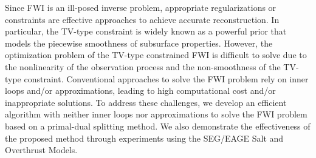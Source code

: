 Since FWI is an ill-posed inverse problem, appropriate regularizations or constraints are effective approaches to achieve accurate reconstruction.
In particular, the TV-type constraint is widely known as a powerful prior that models the piecewise smoothness of subsurface properties.
However, the optimization problem of the TV-type constrained FWI is difficult to solve due to the nonlinearity of the observation process and the non-smoothness of the TV-type constraint.
Conventional approaches to solve the FWI problem rely on inner loops and/or approximations, leading to high computational cost and/or inappropriate solutions.
To address these challenges, we develop an efficient algorithm with neither inner loops nor approximations to solve the FWI problem based on a primal-dual splitting method.
We also demonstrate the effectiveness of the proposed method through experiments using the SEG/EAGE Salt and Overthrust Models.






